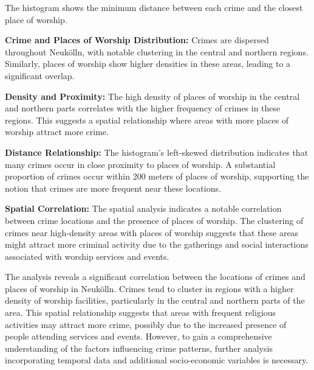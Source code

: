\begin{figure}[h]
\begin{subfigure}[b]{0.45\textwidth}
        \caption{}
        \label{fig:image2}
    \end{subfigure}

\end{figure}
The histogram shows the minimum distance between each crime and the closest place of worship. 

\textbf{Crime and Places of Worship Distribution:} Crimes are dispersed throughout Neukölln, with notable clustering in the central and northern regions. Similarly, places of worship show higher densities in these areas, leading to a significant overlap. 

\textbf{Density and Proximity:} The high density of places of worship in the central and northern parts correlates with the higher frequency of crimes in these regions. This suggests a spatial relationship where areas with more places of worship attract more crime. 

\textbf{Distance Relationship:} The histogram's left-skewed distribution indicates that many crimes occur in close proximity to places of worship. A substantial proportion of crimes occur within 200 meters of places of worship, supporting the notion that crimes are more frequent near these locations. 

\textbf{Spatial Correlation:} The spatial analysis indicates a notable correlation between crime locations and the presence of places of worship. The clustering of crimes near high-density areas with places of worship suggests that these areas might attract more criminal activity due to the gatherings and social interactions associated with worship services and events. 

The analysis reveals a significant correlation between the locations of crimes and places of worship in Neukölln. Crimes tend to cluster in regions with a higher density of worship facilities, particularly in the central and northern parts of the area. This spatial relationship suggests that areas with frequent religious activities may attract more crime, possibly due to the increased presence of people attending services and events. However, to gain a comprehensive understanding of the factors influencing crime patterns, further analysis incorporating temporal data and additional socio-economic variables is necessary. 
